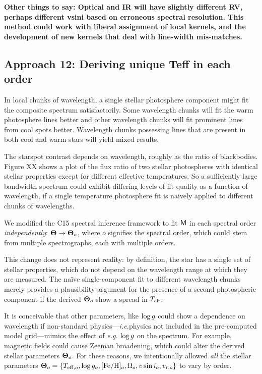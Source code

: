 \documentclass[onecolumn]{emulateapj}%
\newcommand{\iancze}{{\sc C15 }}
\begin{document}
\textbf{Other things to say: Optical and IR will have slightly different RV, perhaps different vsini based on erroneous spectral resolution.  This method could work with liberal assignment of local kernels, and the development of new kernels that deal with line-width mis-matches.}

\subsection{Approach 12: Deriving unique Teff in each order}
\label{sec:approach12}

In local chunks of wavelength, a single stellar photosphere component might fit the composite spectrum satisfactorily.  Some wavelength chunks will fit the warm photosphere lines better and other wavelength chunks will fit prominent lines from cool spots better.  Wavelength chunks possessing lines that are present in both cool and warm stars will yield mixed results.

The starspot contrast depends on wavelength, roughly as the ratio of blackbodies.  Figure XX shows a plot of the flux ratio of two stellar photospheres with identical stellar properties except for different effective temperatures.  So a sufficiently large bandwidth spectrum could exhibit differing levels of fit quality as a function of wavelength, if a single temperature photosphere fit is naively applied to different chunks of wavelengths.  

We modified the \iancze spectral inference framework to fit $\mathsf{M}$ in each spectral order \emph{independently}: ${\bm \Theta} \rightarrow {\bm \Theta}_o$, where $o$ signifies the spectral order, which could stem from multiple spectrographs, each with multiple orders.  

This change does not represent reality: by definition, the star has a single set of stellar properties, which do not depend on the wavelength range at which they are measured.  The na\"ive single-component fit to different wavelength chunks merely provides a plausibility argument for the presence of a second photospheric component if the derived ${\bm \Theta}_o$ show a spread in $T_\textrm{eff}$.  

It is conceivable that other parameters, like $\log g$ could show a dependence on wavelength if non-standard physics---\emph{i.e.}physics not included in the pre-computed model grid---mimics the effect of \emph{e.g.} $\log g$ on the spectrum.  For example, magnetic fields could cause Zeeman broadening, which could alter the derived stellar parameters ${\bm \Theta}_o$.  For these reasons, we intentionally allowed \emph{all} the stellar parameters ${\bm \Theta}_o = \{T_{\mathrm{eff},o}, \log{g_o}, [{\rm Fe}/{\rm H}]_o, \Omega_{o}, v\sin{i}_o, v_{r,o}\}$ to vary by order.  
\end{document}
